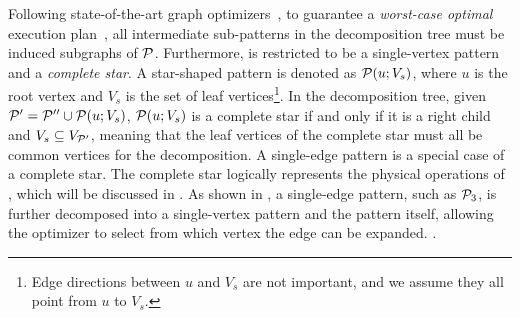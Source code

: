 Following state-of-the-art graph optimizers~\cite{huge,GLogS}, to guarantee a \emph{worst-case optimal} execution plan~\cite{ngo2018worst}, all intermediate sub-patterns in the decomposition tree must be induced subgraphs of $\mathcal{P}$. Furthermore, \mmc is restricted to be a single-vertex pattern and a \emph{complete star}. A star-shaped pattern is denoted as $\mathcal{P}(u;V_s)$, where $u$ is the root vertex and $V_s$ is the set of leaf vertices\footnote{Edge directions between $u$ and $V_s$ are not important, and we assume they all point from $u$ to $V_s$.}. In the decomposition tree, given $\mathcal{P}' = \mathcal{P}'' \cup \mathcal{P}(u;V_s)$, $\mathcal{P}(u;V_s)$ is a complete star if and only if it is a right child and $V_s \subseteq V_{\mathcal{P}'}$, meaning that the leaf vertices of the complete star must all be common vertices for the decomposition. A single-edge pattern is a special case of a complete star. The complete star logically represents the physical operations of \expandintersect, which will be discussed in . As shown in , a single-edge pattern, such as $\mathcal{P}_3$, is further decomposed into a single-vertex pattern and the pattern itself, allowing the optimizer to select from which vertex the edge can be expanded.
.



